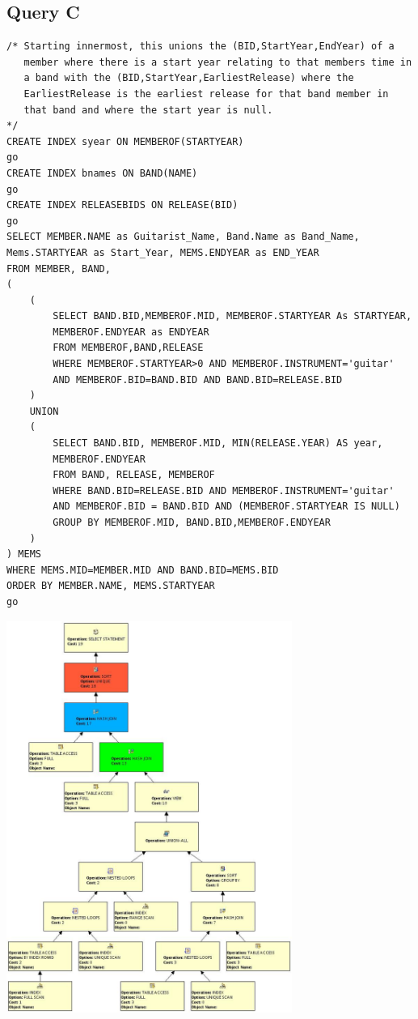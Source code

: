 \documentclass{report}
\begin{document}
\subsection*{Query C}
\begin{verbatim}
/* Starting innermost, this unions the (BID,StartYear,EndYear) of a
   member where there is a start year relating to that members time in
   a band with the (BID,StartYear,EarliestRelease) where the
   EarliestRelease is the earliest release for that band member in
   that band and where the start year is null.
*/
CREATE INDEX syear ON MEMBEROF(STARTYEAR)
go
CREATE INDEX bnames ON BAND(NAME)
go
CREATE INDEX RELEASEBIDS ON RELEASE(BID)
go
SELECT MEMBER.NAME as Guitarist_Name, Band.Name as Band_Name,
Mems.STARTYEAR as Start_Year, MEMS.ENDYEAR as END_YEAR
FROM MEMBER, BAND,
(
    (
        SELECT BAND.BID,MEMBEROF.MID, MEMBEROF.STARTYEAR As STARTYEAR,
        MEMBEROF.ENDYEAR as ENDYEAR
        FROM MEMBEROF,BAND,RELEASE
        WHERE MEMBEROF.STARTYEAR>0 AND MEMBEROF.INSTRUMENT='guitar'
        AND MEMBEROF.BID=BAND.BID AND BAND.BID=RELEASE.BID
    )
    UNION
    (
        SELECT BAND.BID, MEMBEROF.MID, MIN(RELEASE.YEAR) AS year,
        MEMBEROF.ENDYEAR
        FROM BAND, RELEASE, MEMBEROF
        WHERE BAND.BID=RELEASE.BID AND MEMBEROF.INSTRUMENT='guitar' 
        AND MEMBEROF.BID = BAND.BID AND (MEMBEROF.STARTYEAR IS NULL)
        GROUP BY MEMBEROF.MID, BAND.BID,MEMBEROF.ENDYEAR
    )
) MEMS
WHERE MEMS.MID=MEMBER.MID AND BAND.BID=MEMS.BID
ORDER BY MEMBER.NAME, MEMS.STARTYEAR
go
\end{verbatim}
\includegraphics[width=0.7\textwidth]{Q3}
\end{document}
